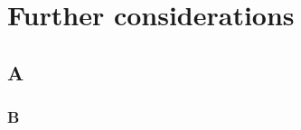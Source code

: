 \documentclass[../HDF5_RFC.tex]{subfiles}
\begin{document}
\section{Further considerations}
\label{further_considerations}

\subsection{A}

\subsubsection{B}
\end{document}
